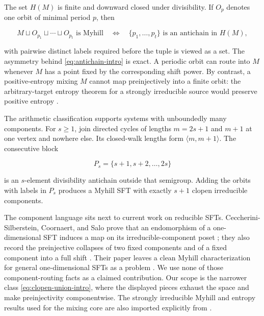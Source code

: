 The set $H(M)$ is finite and downward closed under divisibility.  If $O_p$
denotes one orbit of minimal period $p$, then

\begin{equation}
 M\sqcup O_{p_1}\sqcup\cdots\sqcup O_{p_t}
 \text{ is Myhill}
 \quad\Longleftrightarrow\quad
 \{p_1,\ldots,p_t\}\text{ is an antichain in }H(M),
 \label{eq:antichain-intro}
\end{equation}

with pairwise distinct labels required before the tuple is viewed as a set.
The asymmetry behind \eqref{eq:antichain-intro} is exact.  A periodic orbit
can route into $M$ whenever $M$ has a point fixed by the corresponding shift
power.  By contrast, a positive-entropy mixing $M$ cannot map
preinjectively into a finite orbit: the arbitrary-target entropy theorem for
a strongly irreducible source would preserve positive entropy
\cite[Theorem~5.1]{ceccheriniCoornaert2012}.

The arithmetic classification supports systems with unboundedly many
components.  For $s\geq1$, join directed cycles of lengths $m=2s+1$ and
$m+1$ at one vertex and nowhere else.  Its closed-walk lengths form
$\langle m,m+1\rangle$.  The consecutive block

\begin{equation}
  P_s=\{s+1,s+2,\ldots,2s\}
  \label{eq:Ps-intro}
\end{equation}

is an $s$-element divisibility antichain outside that semigroup.  Adding the
orbits with labels in $P_s$ produces a Myhill SFT with exactly $s+1$ clopen
irreducible components.

The component language sits next to current work on reducible SFTs.
Ceccherini-Silberstein, Coornaert, and Salo prove that an endomorphism of a
one-dimensional SFT induces a map on its irreducible-component poset
\cite[Proposition~3.14]{ceccheriniCoornaertSalo2026}; they also record the
preinjective collapses of two fixed components and of a fixed component into a
full shift \cite[Examples~8.3 and~8.6]{ceccheriniCoornaertSalo2026}.  Their
paper leaves a clean Myhill characterization for general one-dimensional SFTs
as a problem \cite[Section~9]{ceccheriniCoornaertSalo2026}.  We use none of
those component-routing facts as a claimed contribution.  Our scope is the
narrower class \eqref{eq:clopen-union-intro}, where the displayed pieces
exhaust the space and make preinjectivity componentwise.  The strongly
irreducible Myhill and entropy results used for the mixing core are also
imported explicitly from \cite{ceccheriniCoornaert2012}.

